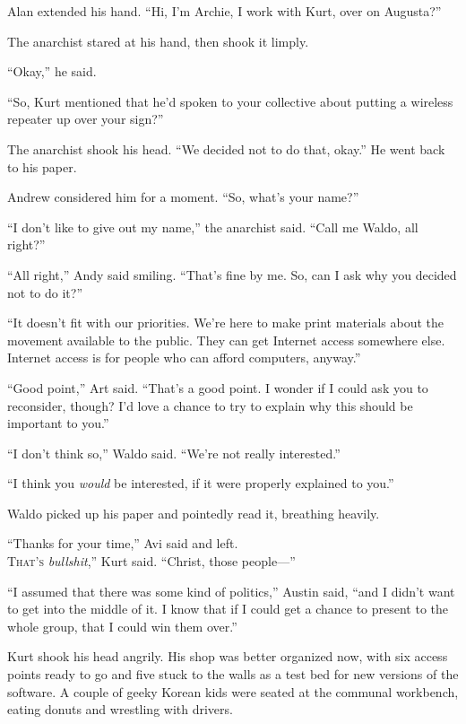 Alan extended his hand.  ``Hi, I'm Archie, I work with Kurt, over on
Augusta?''

The anarchist stared at his hand, then shook it limply.

``Okay,'' he said.

``So, Kurt mentioned that he'd spoken to your collective about putting
a wireless repeater up over your sign?''

The anarchist shook his head.  ``We decided not to do that, okay.'' He
went back to his paper.

Andrew considered him for a moment.  ``So, what's your name?''

``I don't like to give out my name,'' the anarchist said.  ``Call me
Waldo, all right?''

``All right,'' Andy said smiling.  ``That's fine by me.  So, can I ask
why you decided not to do it?''

``It doesn't fit with our priorities.  We're here to make print
materials about the movement available to the public.  They can get
Internet access somewhere else.  Internet access is for people who can
afford computers, anyway.''

``Good point,'' Art said.  ``That's a good point.  I wonder if I could
ask you to reconsider, though?  I'd love a chance to try to explain
why this should be important to you.''

``I don't think so,'' Waldo said.  ``We're not really interested.''

``I think you \textit{would} be interested, if it were properly
explained to you.''

Waldo picked up his paper and pointedly read it, breathing heavily.

``Thanks for your time,'' Avi said and left.
\\
\lettrine[lines=3, lhang=.5, nindent=0pt, findent=2pt]{T}{hat's}
\textit{bullshit},'' Kurt said.  ``Christ, those people---''

``I assumed that there was some kind of politics,'' Austin said, ``and
I didn't want to get into the middle of it.  I know that if I could
get a chance to present to the whole group, that I could win them
over.''

Kurt shook his head angrily.  His shop was better organized now, with
six access points ready to go and five stuck to the walls as a test
bed for new versions of the software.  A couple of geeky Korean kids
were seated at the communal workbench, eating donuts and wrestling
with drivers.

